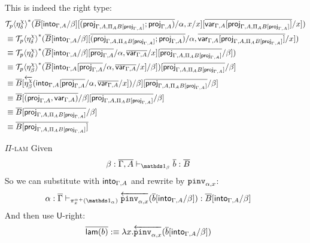 \documentclass[10pt]{article}
\theoremstyle{definition}
\newcommand{\yields}{\vdash}
\newcommand{\rewrite}[2]{\overleftarrow{#1}(#2)}
\newcommand\UI[2]{\ensuremath{\lambda #1.#2}}
\newcommand\St[2]{\ensuremath{{#1}^*(#2)}}
\newcommand\TrPlus[2]{\ensuremath{{#1}^+(#2)}}
\newcommand\ApEl[2]{\mathcal{T}_{#1}\langle#2\rangle}
\begin{document}
\begin{enumerate}
This is indeed the right type:
\begin{align*}
&\St{\ApEl{p}{\eta^\chi_\delta}}{\upstairs{B}[\into{\Gamma, A}/\beta][\upstairs{(\proj{\Gamma, A, \Pi_A B[\proj{\Gamma, A}]};\proj{\Gamma, A})}/\alpha, x/x][\upstairs{\qvar{\Gamma, A}[\proj{\Gamma, A, \Pi_A B[\proj{\Gamma, A}]}]}/x]} \\
&\equiv \St{\ApEl{p}{\eta^\chi_\delta}}{\upstairs{B}[\into{\Gamma, A}/\beta][\upstairs{(\proj{\Gamma, A, \Pi_A B[\proj{\Gamma, A}]};\proj{\Gamma, A})}/\alpha, \upstairs{\qvar{\Gamma, A}[\proj{\Gamma, A, \Pi_A B[\proj{\Gamma, A}]}]}/x]} \\
&\equiv \St{\ApEl{p}{\eta^\chi_\delta}}{\upstairs{B}[\into{\Gamma, A}/\beta][\upstairs{\proj{\Gamma, A}}/\alpha, \upstairs{\qvar{\Gamma, A}}/x][\upstairs{\proj{\Gamma, A, \Pi_A B[\proj{\Gamma, A}]}}/\beta]} \\
&\equiv \St{\ApEl{p}{\eta^\chi_\beta}}{\upstairs{B}[\into{\Gamma, A}[\upstairs{\proj{\Gamma, A}}/\alpha, \upstairs{\qvar{\Gamma, A}}/x]/\beta]}[\upstairs{\proj{\Gamma, A, \Pi_A B[\proj{\Gamma, A}]}}/\beta] \\
&\equiv \upstairs{B}[\rewrite{\eta^\chi_\beta}{\into{\Gamma, A}[\upstairs{\proj{\Gamma, A}}/\alpha, \upstairs{\qvar{\Gamma, A}}/x]}/\beta][\upstairs{\proj{\Gamma, A, \Pi_A B[\proj{\Gamma, A}]}}/\beta] \\
&\equiv \upstairs{B}[\upstairs{(\proj{\Gamma, A}, \qvar{\Gamma, A})}/\beta][\upstairs{\proj{\Gamma, A, \Pi_A B[\proj{\Gamma, A}]}}/\beta] \\
&\equiv \upstairs{B}[\upstairs{\proj{\Gamma, A, \Pi_A B[\proj{\Gamma, A}]}}/\beta] \\
&\equiv \upstairs{B[\proj{\Gamma, A, \Pi_A B[\proj{\Gamma, A}]}]}
\end{align*}


\item[\textsc{$\Pi$-lam}] Given
\begin{align*}
\beta : \upstairs{\Gamma, A} \yields_{\One_\beta} \upstairs{b} : \upstairs{B}
\end{align*}
So we can substitute with $\mathsf{into}_{\Gamma, A}$ and rewrite by $\mathtt{pinv}_{\alpha,x}$:
\begin{align*}
\alpha : \upstairs{\Gamma} \yields_{\TrPlus{\pi^\alpha_x}{\One_{\alpha}}} \rewrite{\pinv{\alpha,x}}{\upstairs{b}[\into{\Gamma, A}/\beta]} : \upstairs{B}[\into{\Gamma, A}/\beta]
\end{align*}
And then use $\mathsf{U}$-right: 
\begin{align*}
\upstairs{\qlam(b)} :\equiv \UI{x}{\rewrite{\pinv{\alpha,x}}{\upstairs{b}[\into{\Gamma, A}/\beta]}}
\end{align*}
\end{enumerate}
\end{document}
